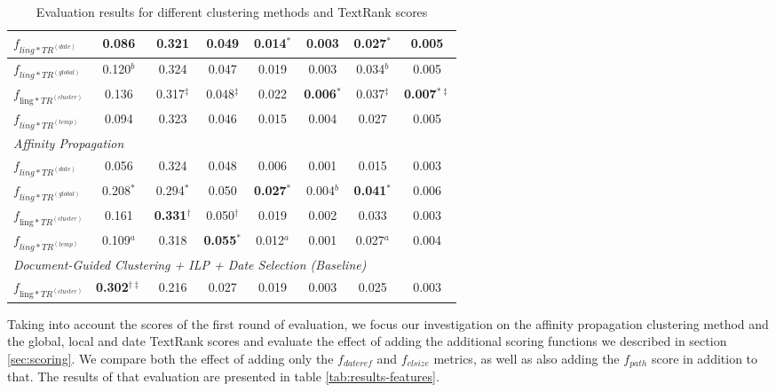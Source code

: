 \documentclass[a4paper,BCOR=10mm]{report}
\numberwithin{lemma}{chapter}
\numberwithin{definition}{chapter}
\begin{document}
\begin{table}
\begin{centering}
{\begin{tabular}{|l|c|cc|cc|cc|}
$f_{ling*TR^{(date)}}$   & 0.086    & 0.321 & 0.049 & 0.014$^{*}$   & 0.003 & 0.027$^{*}$   & 0.005 \\\hline
$f_{ling*TR^{(global)}}$     & 0.120$^{b}$  & 0.324 & 0.047 & 0.019 & 0.003 & 0.034$^{b}$   & 0.005 \\\hline
$f_{\text{ling}*TR^{(cluster)}}$     & 0.136    & 0.317$^{\ddagger}$    & 0.048$^{\ddagger}$    & 0.022 & \textbf{0.006}$^{*}$  & 0.037$^{\ddagger}$    & \textbf{0.007}$^{*\ddagger}$ \\\hline
$f_{ling*TR^{(temp)}}$   & 0.094    & 0.323 & 0.046 & 0.015 & 0.004 & 0.027 & 0.005 \\\hline
\multicolumn{8}{|l|}{ \textit{Affinity Propagation} }\\\hline
$f_{ling*TR^{(date)}}$   & 0.056    & 0.324 & 0.048 & 0.006 & 0.001 & 0.015 & 0.003 \\\hline
$f_{ling*TR^{(global)}}$     & 0.208$^{*}$  & 0.294$^{*}$   & 0.050 & \textbf{0.027}$^{*}$  & 0.004$^{b}$   & \textbf{0.041}$^{*}$  & 0.006 \\\hline
$f_{\text{ling}*TR^{(cluster)}}$     & 0.161    & \textbf{0.331}$^{\dagger}$    & 0.050$^{\dagger}$ & 0.019 & 0.002 & 0.033 & 0.003 \\\hline
$f_{ling*TR^{(temp)}}$   & 0.109$^{a}$  & 0.318 & \textbf{0.055}$^{*}$  & 0.012$^{a}$   & 0.001 & 0.027$^{a}$   & 0.004 \\\hline
\multicolumn{8}{|l|}{ \textit{Document-Guided Clustering + ILP + Date Selection (Baseline)} }\\\hline
$f_{\text{ling}*TR^{(cluster)}}$     & \textbf{0.302}$^{\dagger\ddagger}$   & 0.216 & 0.027 & 0.019 & 0.003 & 0.025 & 0.003 \\\hline
\end{tabular}
}
\end{centering}
\caption{Evaluation results for different clustering methods and TextRank scores}
\label{tab:eval-cl-tr}
\end{table}


Taking into account the scores of the first round of evaluation, we focus our investigation on the affinity propagation clustering method and the global, local and date TextRank scores and evaluate the effect of adding the additional scoring functions we described in section \ref{sec:scoring}.
We compare both the effect of adding only the $f_{dateref}$ and $f_{clsize}$ metrics, as well as also adding the $f_{path}$ score in addition to that.
The results of that evaluation are presented in table \ref{tab:results-features}.
\end{document}
